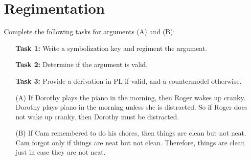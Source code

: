 \documentclass[a4paper, 11pt]{article} %
\begin{document}
\begin{enumerate}[leftmargin=1.5in]
\end{enumerate}


\section*{Regimentation}

\noindent
Complete the following tasks for arguments (A) and (B):

\begin{enumerate}
  \item[\bf Task 1:] Write a symbolization key and regiment the argument.
  \item[\bf Task 2:] Determine if the argument is valid.
  \item[\bf Task 3:] Provide a derivation in PL if valid, and a countermodel otherwise.
  \bigskip
  \item[(A)] If Dorothy plays the piano in the morning, then Roger wakes up cranky.
    Dorothy plays piano in the morning unless she is distracted.
    So if Roger does not wake up cranky, then Dorothy must be distracted.
  \item[(B)] If Cam remembered to do his chores, then things are clean but not neat.
    Cam forgot only if things are neat but not clean.
    Therefore, things are clean just in case they are not neat.
\end{enumerate}
\end{document}
